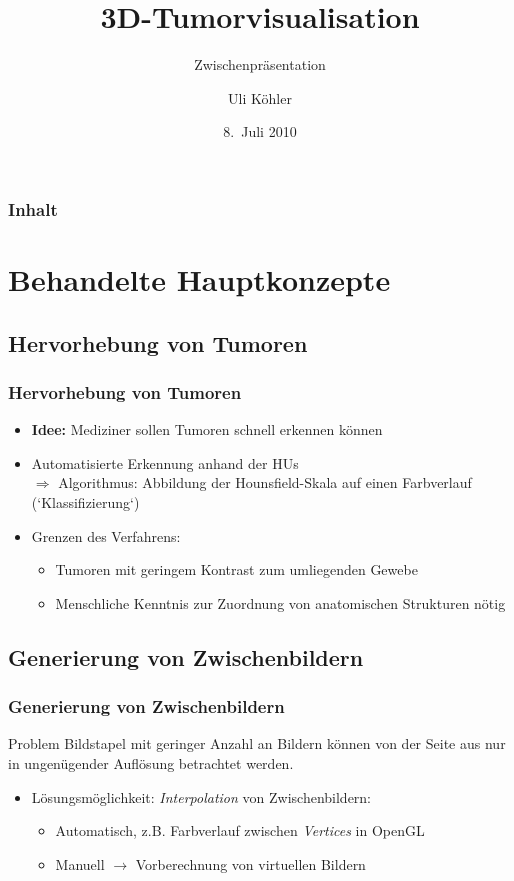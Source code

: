 \documentclass[14pt]{beamer}
\title{3D-Tumorvisualisation}
\subtitle{Zwischenpräsentation}
\author{Uli Köhler}
\institute[EMG]{Ernst-Mach-Gymnasium Haar}
\date{8.~Juli 2010}
\begin{document}
\nocite{*}


\frame{\titlepage}
\begin{frame}
\frametitle{Inhalt}
\tableofcontents
\end{frame}
\section{Behandelte Hauptkonzepte}
\subsection{Hervorhebung von Tumoren}
\begin{frame}[allowframebreaks]
 \frametitle{Hervorhebung von Tumoren}
    \begin{itemize}
     \item \textbf{Idee:} Mediziner sollen Tumoren schnell erkennen können
     \item Automatisierte Erkennung anhand der HUs\\
	  $\Rightarrow$ Algorithmus: Abbildung der Hounsfield-Skala auf einen Farbverlauf (`Klassifizierung`)
     \item Grenzen des Verfahrens:
      \begin{itemize}
	\item Tumoren mit geringem Kontrast zum umliegenden Gewebe
	\item Menschliche Kenntnis zur Zuordnung von anatomischen Strukturen nötig
      \end{itemize}
    \end{itemize}
\end{frame}
\subsection{Generierung von Zwischenbildern}
\begin{frame}[allowframebreaks]
 \frametitle{Generierung von Zwischenbildern}
      \begin{block}{Problem}
	      Bildstapel mit geringer Anzahl an Bildern können von der Seite aus nur in ungenügender
	      Auflösung betrachtet werden.
      \end{block}
    \begin{itemize}
     \item Lösungsmöglichkeit: \textit{Interpolation} von Zwischenbildern:
      \begin{itemize}
	\item Automatisch, z.B. Farbverlauf zwischen \textit{Vertices} in OpenGL
	\item Manuell $\rightarrow$ Vorberechnung von virtuellen Bildern
      \end{itemize}
    \end{itemize}
\end{frame}
\end{document}
